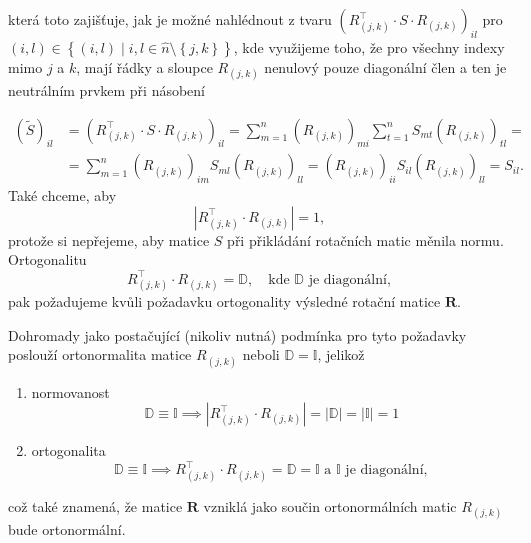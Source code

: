 \documentclass[czech]{article}
\renewcommand\tilde\widetilde
\renewcommand\hat\widehat
\begin{document}
která toto zajišťuje, jak je možné nahlédnout z tvaru $\left(R_{(j,k)}^{\top}\cdot S \cdot R_{(j,k)}\right)_{il}$ pro $(i,l) \in \left\{ (i,l) \mid i,l \in \hat{n}\setminus \left\{ j,k \right\} \right\} $, kde využijeme toho, že pro všechny indexy mimo $j$ a $k$, mají řádky a sloupce $R_{(j,k)}$ nenulový pouze diagonální člen a ten je neutrálním prvkem při násobení

\[
	\begin{split}
		\left(\tilde{S}\right)_{il} &= \left( R_{(j,k)}^{\top} \cdot S \cdot R_{(j,k)} \right)_{il} = \sum_{m = 1}^{n} \left( R_{(j,k)} \right)_{mi} \sum_{t = 1}^{n} S_{mt} \left( R_{(j,k)} \right)_{tl} = \\
		&= \sum_{m=1}^{n} \left( R_{(j,k)} \right)_{im} S_{ml} \left( R_{(j,k)} \right)_{ll} = \left( R_{(j,k)} \right)_{ii}S_{il}\left( R_{(j,k)} \right)_{ll} = S_{il}
		.\end{split}
\]
Také chceme, aby
\begin{equation}
	\label{eq:pozadavek_specialni_linearity}
	\left|R_{(j,k)}^{\top}\cdot R_{(j,k)}\right| = 1,
\end{equation}
protože si nepřejeme, aby matice $S$ při přikládání rotačních matic měnila normu. Ortogonalitu
\[
	R_{(j,k)}^{\top}\cdot R_{(j,k)} = \mathbb{D},\quad \text{kde } \mathbb{D} \text{ je diagonální},
\]
pak požadujeme kvůli požadavku ortogonality výsledné rotační matice $\boldsymbol{R}$.

Dohromady jako postačující (nikoliv nutná) podmínka pro tyto požadavky poslouží ortonormalita matice $R_{(j,k)}$ neboli $\mathbb{D} = \mathbb{I}$, jelikož
\begin{enumerate}[label=(\alph*)]
	\item normovanost
	      \[
		      \mathbb{D} \equiv \mathbb{I} \implies \left| R_{(j,k)}^{\top}\cdot R_{(j,k)} \right| = \left| \mathbb{D} \right| = \left| \mathbb{I} \right|  = 1
	      \]
	\item ortogonalita
	      \[
		      \mathbb{D} \equiv \mathbb{I} \implies R_{(j,k)}^{\top}\cdot R_{(j,k)} = \mathbb{D} = \mathbb{I} \text{ a } \mathbb{I} \text{ je diagonální},
	      \]
\end{enumerate}
což také znamená, že matice $\boldsymbol{R}$ vzniklá jako součin ortonormálních matic $R_{(j,k)}$ bude ortonormální.
\end{document}
